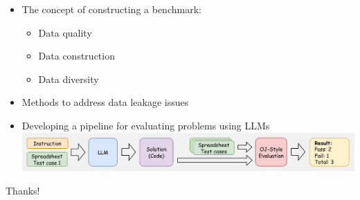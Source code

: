 \documentclass{beamer}
\begin{document}
\begin{frame}
    \begin{itemize}
        \item The concept of constructing a benchmark:
        \begin{itemize}
            \item Data quality
            \item Data construction
            \item Data diversity
        \end{itemize}
        \item Methods to address data leakage issues
        \item Developing a pipeline for evaluating problems using LLMs
        \includegraphics[width=1\linewidth]{pic/OJ Evaluation pipeline.jpg}
    \end{itemize}
\end{frame}

\begin{frame}
    \begin{center}
        {\Huge\calligra Thanks!}
    \end{center}
\end{frame}
\end{document}
